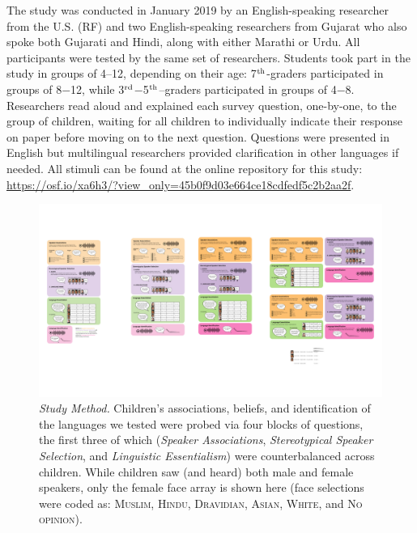 \documentclass{foushee-adapted-preprint}
\begin{document}


The study was conducted in January 2019 by an English-speaking researcher from the U.S. (RF) and two English-speaking researchers from Gujarat who also spoke both Gujarati and Hindi, along with either Marathi or Urdu. 
All participants were tested by the same set of researchers. 
Students took part in the study in groups of 4--12, depending on their age: 7$^{\textnormal{th}}$-graders participated in groups of 8$-$12, while 3$^{\textnormal{rd}}$$-$5$^{\textnormal{th}}$--graders participated in groups of 4$-$8. Researchers read aloud and explained each survey question, one-by-one, to the group of children, waiting for all children to individually indicate their response on paper before moving on to the next question. 
Questions were presented in English but multilingual researchers provided clarification in other languages if needed.
All stimuli can be found at the online repository for this study: \url{https://osf.io/xa6h3/?view_only=45b0f9d03e664ce18cdfedf5c2b2aa2f}. 

\begin{figure}
    \centering
    \includegraphics[width=\linewidth]{figures/2024-IndiaSocioling-Final.pdf}
    \caption{\textit{Study Method.} 
    Children's associations, beliefs, and identification of the languages we tested were probed via four blocks of questions, the first three of which (\textit{Speaker Associations}, \textit{Stereotypical Speaker Selection}, and \textit{Linguistic Essentialism}) were counterbalanced across children.
    While children saw (and heard) both male and female speakers, only the female face array is shown here (face selections were coded as: \textsc{Muslim}, \textsc{Hindu}, \textsc{Dravidian}, \textsc{Asian}, \textsc{White}, and \textsc{No opinion}).  %
    }
    \label{fig:method}
\end{figure}
\end{document}
